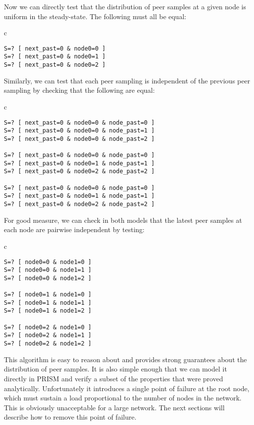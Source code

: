 \documentclass[a4paper,10pt]{article}
\newenvironment{prismprop}[0]{
  \begin{center}
  \begin{tabular}{c}
  \footnotesize
}{
  \end{tabular}
  \end{center}
}
\begin{document}
Now we can directly test that the distribution of peer samples at a given node is uniform in the steady-state. The following must all be equal:

\begin{prismprop}
\begin{lstlisting}
S=? [ next_past=0 & node0=0 ]
S=? [ next_past=0 & node0=1 ]
S=? [ next_past=0 & node0=2 ]
\end{lstlisting}
\end{prismprop}

Similarly, we can test that each peer sampling is independent of the previous peer sampling by checking that the following are equal:

\begin{prismprop}
\begin{lstlisting}
S=? [ next_past=0 & node0=0 & node_past=0 ]
S=? [ next_past=0 & node0=0 & node_past=1 ]
S=? [ next_past=0 & node0=0 & node_past=2 ]

S=? [ next_past=0 & node0=0 & node_past=0 ]
S=? [ next_past=0 & node0=1 & node_past=1 ]
S=? [ next_past=0 & node0=2 & node_past=2 ]

S=? [ next_past=0 & node0=0 & node_past=0 ]
S=? [ next_past=0 & node0=1 & node_past=1 ]
S=? [ next_past=0 & node0=2 & node_past=2 ]
\end{lstlisting}
\end{prismprop}

For good measure, we can check in both models that the latest peer samples at each node are pairwise independent by testing:

\begin{prismprop}
\begin{lstlisting}
S=? [ node0=0 & node1=0 ]
S=? [ node0=0 & node1=1 ]
S=? [ node0=0 & node1=2 ]

S=? [ node0=1 & node1=0 ]
S=? [ node0=1 & node1=1 ]
S=? [ node0=1 & node1=2 ]

S=? [ node0=2 & node1=0 ]
S=? [ node0=2 & node1=1 ]
S=? [ node0=2 & node1=2 ]
\end{lstlisting}
\end{prismprop}

This algorithm is easy to reason about and provides strong guarantees about the distribution of peer samples. It is also simple enough that we can model it directly in PRISM and verify a subset of the properties that were proved analytically. Unfortunately it introduces a single point of failure at the root node, which must sustain a load proportional to the number of nodes in the network. This is obviously unacceptable for a large network. The next sections will describe how to remove this point of failure.
\end{document}
